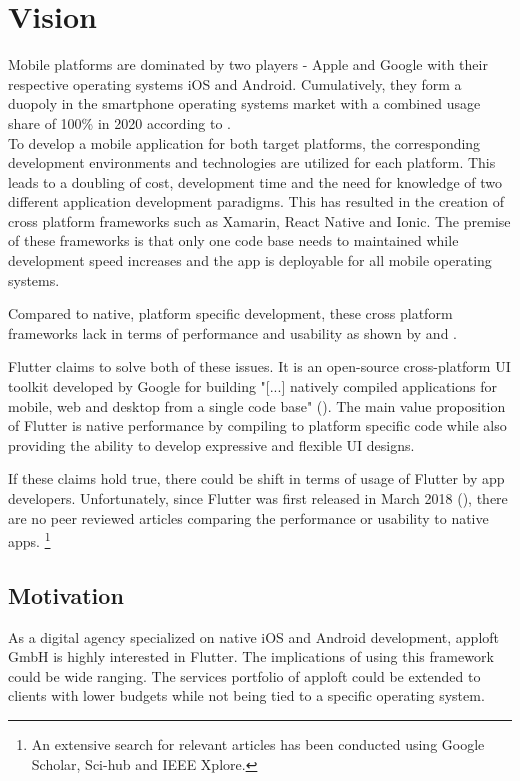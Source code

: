 \chapter{Vision}
Mobile platforms are dominated by two players - Apple and Google with their respective operating systems iOS and Android. Cumulatively, they form a duopoly in the smartphone operating systems market with a combined usage share of 100\% in 2020 according to \textcite{IDC2020}. \\To develop a mobile application for both target platforms, the corresponding development environments and technologies are utilized for each platform. This leads to a doubling of cost, development time and the need for knowledge of two different application development paradigms. This has resulted in the creation of cross platform frameworks such as Xamarin, React Native and Ionic. The premise of these frameworks is that only one code base needs to maintained while development speed increases and the app is deployable for all mobile operating systems. 

Compared to native, platform specific development, these cross platform frameworks lack in terms of performance and usability as shown by \textcite{Mercado2016} and \textcite{Ebone2018}.

Flutter claims to solve both of these issues. It is an open-source cross-platform UI toolkit developed by Google for building "[...] natively compiled applications for mobile, web and desktop from a single code base" (\cite{FlutterDev20}). The main value proposition of Flutter is native performance by compiling to platform specific code while also providing the ability to develop expressive and flexible UI designs.

If these claims hold true, there could be shift in terms of usage of Flutter by app developers. Unfortunately, since Flutter was first released in March 2018 (\cite{FlutterReleases2020}), there are no peer reviewed articles comparing the performance or usability to native apps.
\footnote{An extensive search for relevant articles has been conducted using Google Scholar, Sci-hub and IEEE Xplore.} 

\section{Motivation}
As a digital agency specialized on native iOS and Android development, apploft GmbH is highly interested in Flutter. The implications of using this framework could be wide ranging. The services portfolio of apploft could be extended to clients with lower budgets while not being tied to a specific operating system. 

